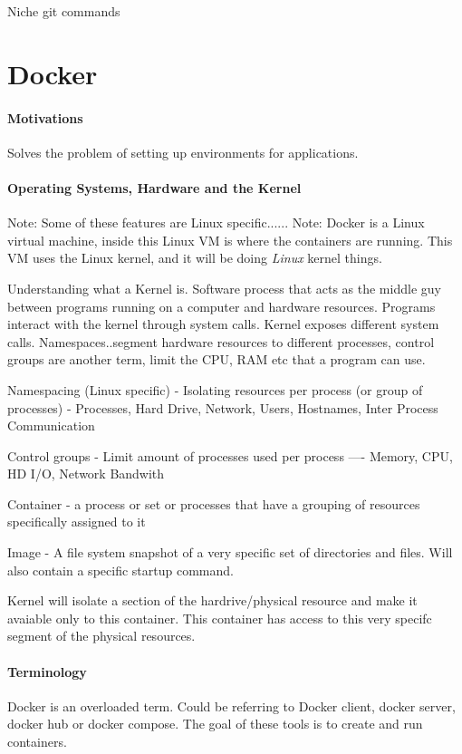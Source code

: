 \documentclass[a4paper, 11pt]{book}
\begin{document}
    Niche git commands


    \section{Docker}

    \paragraph{Motivations}
    Solves the problem of setting up environments for applications.

    \paragraph{Operating Systems, Hardware and the Kernel}
    Note: Some of these features are Linux specific......
    Note: Docker is a Linux virtual machine, inside this Linux VM is where the containers are running.
    This VM uses the Linux kernel, and it will be doing \textit{Linux} kernel things.

    Understanding what a Kernel is.
    Software process that acts as the middle guy between programs running on a computer and hardware resources.
    Programs interact with the kernel through system calls.
    Kernel exposes different system calls.
    Namespaces..segment hardware resources to different processes, control groups are another term, limit the CPU, RAM etc that a program can use.

    Namespacing (Linux specific) - Isolating resources per process (or group of processes) - Processes, Hard Drive, Network, Users, Hostnames, Inter Process Communication

    Control groups - Limit amount of processes used per process ---- Memory, CPU, HD I/O, Network Bandwith

    Container - a process or set or processes that have a grouping of resources specifically assigned to it

    Image - A file system snapshot of a very specific set of directories and files.
    Will also contain a specific startup command.

    Kernel will isolate a section of the hardrive/physical resource and make it avaiable only to this container.
    This container has access to this very specifc segment of the physical resources.


    \paragraph{Terminology}
    Docker is an overloaded term.
    Could be referring to Docker client, docker server, docker hub or docker compose.
    The goal of these tools is to create and run containers.
\end{document}
